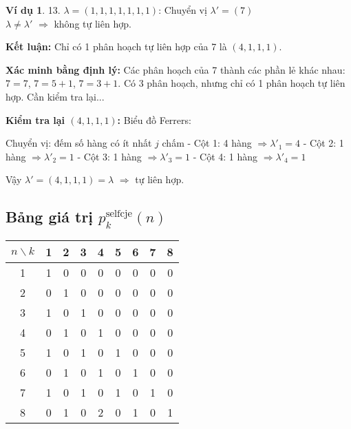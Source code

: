 \documentclass[12pt,a4paper]{article}
\theoremstyle{definition}
\newtheorem{example}{Ví dụ}
\begin{document}
\begin{example}
13. $\lambda = (1,1,1,1,1,1,1)$: Chuyển vị $\lambda' = (7)$ \\
    $\lambda \neq \lambda'$ $\Rightarrow$ không tự liên hợp.

\textbf{Kết luận:} Chỉ có 1 phân hoạch tự liên hợp của 7 là $(4,1,1,1)$.

\textbf{Xác minh bằng định lý:} Các phân hoạch của 7 thành các phần lẻ khác nhau: $7 = 7$, $7 = 5 + 1$, $7 = 3 + 1$. 
Có 3 phân hoạch, nhưng chỉ có 1 phân hoạch tự liên hợp. Cần kiểm tra lại...

\textbf{Kiểm tra lại $(4,1,1,1)$:}
Biểu đồ Ferrers:
\begin{center}
\end{center}

Chuyển vị: đếm số hàng có ít nhất $j$ chấm
- Cột 1: 4 hàng $\Rightarrow \lambda'_1 = 4$
- Cột 2: 1 hàng $\Rightarrow \lambda'_2 = 1$  
- Cột 3: 1 hàng $\Rightarrow \lambda'_3 = 1$
- Cột 4: 1 hàng $\Rightarrow \lambda'_4 = 1$

Vậy $\lambda' = (4,1,1,1) = \lambda$ $\Rightarrow$ tự liên hợp.
\end{example}

\subsection{Bảng giá trị $p_k^{\text{selfcje}}(n)$}

\begin{center}
\begin{tabular}{|c|c|c|c|c|c|c|c|c|}
\hline
$n \backslash k$ & 1 & 2 & 3 & 4 & 5 & 6 & 7 & 8 \\
\hline
1 & 1 & 0 & 0 & 0 & 0 & 0 & 0 & 0 \\
\hline
2 & 0 & 1 & 0 & 0 & 0 & 0 & 0 & 0 \\
\hline
3 & 1 & 0 & 1 & 0 & 0 & 0 & 0 & 0 \\
\hline
4 & 0 & 1 & 0 & 1 & 0 & 0 & 0 & 0 \\
\hline
5 & 1 & 0 & 1 & 0 & 1 & 0 & 0 & 0 \\
\hline
6 & 0 & 1 & 0 & 1 & 0 & 1 & 0 & 0 \\
\hline
7 & 1 & 0 & 1 & 0 & 1 & 0 & 1 & 0 \\
\hline
8 & 0 & 1 & 0 & 2 & 0 & 1 & 0 & 1 \\
\hline
\end{tabular}
\end{center}
\end{document}
